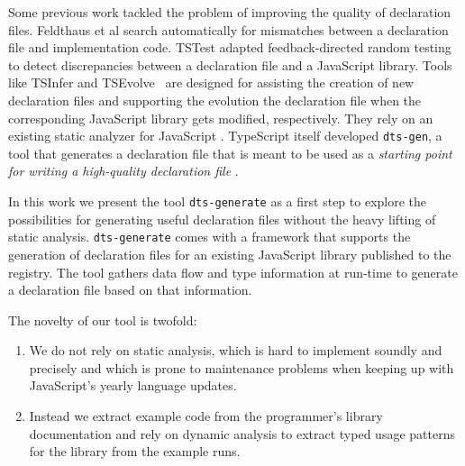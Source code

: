 \documentclass[a4paper,english,cleveref, autoref]{lipics-v2019}
\begin{document}
Some previous work tackled the problem of improving the quality of
declaration files. Feldthaus et al
\cite{DBLP:conf/oopsla/FeldthausM14} search automatically for
mismatches between a declaration file and implementation code. TSTest
\cite{DBLP:journals/pacmpl/KristensenM17}
adapted feedback-directed random testing to detect discrepancies between a
declaration file and a JavaScript library. Tools like TSInfer and
TSEvolve~\cite{DBLP:conf/fase/KristensenM17} are designed for
assisting the creation of new declaration 
files and supporting the evolution the declaration file when the
corresponding JavaScript library gets modified, respectively. They
rely on an existing static analyzer for JavaScript \cite{TAJS}.
TypeScript itself
developed \texttt{dts-gen}, a tool that generates a
declaration file that is meant to be used as a \emph{starting point
for writing a high-quality declaration file} \cite{dts-gen}.

In this work we present the tool \texttt{dts-generate}
as a first step to explore the possibilities for
generating useful declaration files without the heavy lifting of
static analysis. \texttt{dts-generate} comes with a framework that
supports the generation of declaration files for an existing
JavaScript library published to the \NPM{} registry. The tool gathers
data flow and type information at run-time to generate a declaration
file based on that information.

The novelty of our tool is twofold:
\begin{enumerate}
\item 
  We do not rely on static analysis, which is hard to implement
  soundly and precisely and which is prone to maintenance problems
  when keeping up with JavaScript's yearly language updates.
\item
  Instead we extract example code from the programmer's library
  documentation and rely on dynamic analysis to extract typed usage
  patterns for the library from the example runs.
\end{enumerate}

\end{document}

